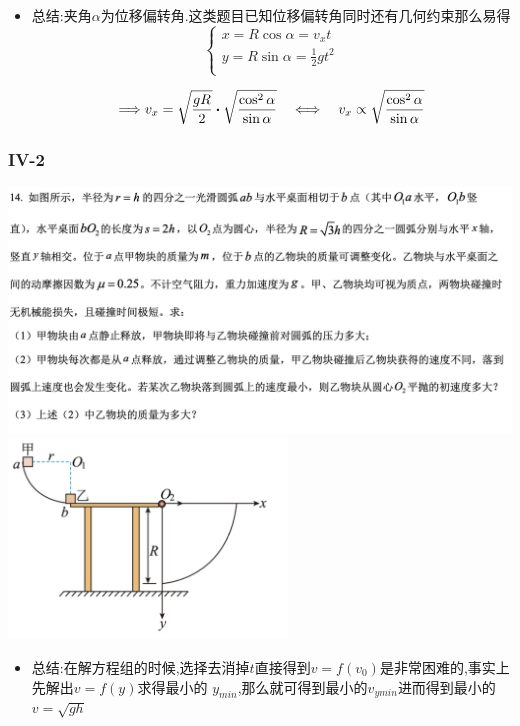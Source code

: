\documentclass{article}
\begin{document}
    \begin{itemize}
        \item 总结:夹角$\alpha$为位移偏转角.这类题目已知位移偏转角同时还有几何约束那么易得
        $$
        \begin{cases}
            x = R \cos{\alpha} = v_{x} t \\
            y = R \sin{\alpha} = \frac{1}{2} g t^{2} \\
        \end{cases}
        $$

        $$
        \lra v_{x} = \sqrt{\frac{gR}{2}} \vdot \sqrt{\frac{\cos^{2}{\alpha}}{\sin{\alpha}}} \quad  \llra \quad  v_{x}  \propto  \sqrt{\frac{\cos^{2}{\alpha}}{\sin{\alpha}}}
        $$

    \end{itemize}

    \subsubsection{IV-2}
    \includegraphics[width=50em,keepaspectratio]{./pictures/1.2-6.png} \\
    \includegraphics[width=20em,keepaspectratio]{./pictures/1.2-7.png}

    \begin{itemize}
        \item 总结:\quad 在解方程组的时候,选择去消掉$t$直接得到$v = f(v_{0})$是非常困难的,事实上先解出$v = f(y)$求得最小的
                  $y_{min}$,那么就可得到最小的$v_{ymin}$进而得到最小的$v = \sqrt{gh}$
    \end{itemize}
    
\end{document}
